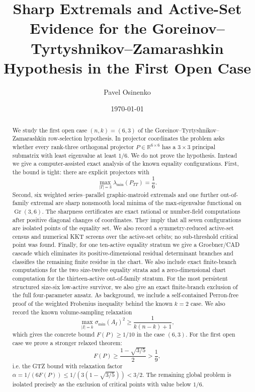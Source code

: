 \documentclass[11pt]{article}
\title{Sharp Extremals and Active-Set Evidence for the Goreinov--Tyrtyshnikov--Zamarashkin Hypothesis in the First Open Case}
\author{Pavel Osinenko}
\date{\today}
\numberwithin{equation}{section}
\theoremstyle{definition}
\newcommand{\R}{\mathbb{R}}
\newcommand{\Gr}{\operatorname{Gr}}
\begin{document}
\maketitle

\begin{abstract}
We study the first open case $(n,k)=(6,3)$ of the
Goreinov--Tyrtyshnikov--Zamarashkin row-selection hypothesis.  In projector
coordinates the problem asks whether every rank-three orthogonal projector
$P\in\R^{6\times6}$ has a $3\times3$ principal submatrix with least eigenvalue
at least $1/6$.  We do not prove the hypothesis.  Instead we give a
computer-assisted exact analysis of the known equality configurations.  First,
the bound is tight: there are explicit projectors with
\[
  \max_{|T|=3}\lambda_{\min}(P_{TT})=\frac16.
\]
Second, six weighted series--parallel graphic-matroid extremals and one further
out-of-family extremal are sharp nonsmooth local minima of the max-eigenvalue
functional on $\Gr(3,6)$.  The sharpness certificates are exact rational or
number-field computations after positive diagonal changes of coordinates.
They imply that all seven configurations are isolated points of the equality
set.  We also record a symmetry-reduced active-set census and numerical KKT
screens over the active-set orbits; no sub-threshold critical point was found.
Finally, for one ten-active equality stratum we give a Groebner/CAD cascade
which eliminates its positive-dimensional residual determinant branches and
classifies the remaining finite residue in the chart.  We also include exact
finite-branch computations for the two size-twelve equality strata and a
zero-dimensional chart computation for the thirteen-active out-of-family
stratum.  For the most persistent structured size-six low-active survivor, we
also give an exact finite-branch exclusion of the full four-parameter ansatz.
As background, we include a self-contained Perron-free proof of the weighted
Frobenius inequality behind the known $k=2$ case.
We also record the known volume-sampling relaxation
\[
  \max_{|I|=k}\sigma_{\min}(A_I)^2\ge \frac{1}{k(n-k)+1},
\]
which gives the concrete bound $F(P)\ge 1/10$ in the case $(6,3)$.
For the first open case we prove a stronger relaxed theorem:
\[
  F(P)\ge \frac{1-\sqrt{3/5}}2>\frac19,
\]
i.e. the GTZ bound with relaxation factor
$\alpha=1/(6F(P))\le 1/(3(1-\sqrt{3/5}))<3/2$.
The remaining global problem is isolated precisely as the exclusion of critical
points with value below $1/6$.
\end{abstract}

\tableofcontents
\end{document}
